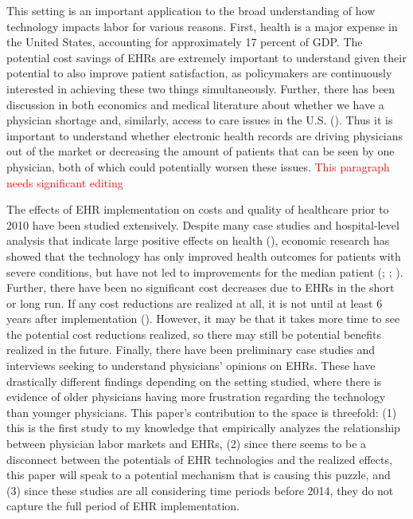 \documentclass[11pt]{article}
\begin{document}
This setting is an important application to the broad understanding of how technology impacts labor for various reasons. First, health is a major expense in the United States, accounting for approximately 17 percent of GDP. The potential cost savings of EHRs are extremely important to understand given their potential to also improve patient satisfaction, as policymakers are continuously interested in achieving these two things simultaneously. Further, there has been discussion in both economics and medical literature about whether we have a physician shortage and, similarly, access to care issues in the U.S. (\cite{cooper2002economic}). Thus it is important to understand whether electronic health records are driving physicians out of the market or decreasing the amount of patients that can be seen by one physician, both of which could potentially worsen these issues. \textcolor{red}{This paragraph needs significant editing}

The effects of EHR implementation on costs and quality of healthcare prior to 2010 have been studied extensively. Despite many case studies and hospital-level analysis that indicate large positive effects on health (\cite{Buntin2011TheResults}), economic research has showed that the technology has only improved health outcomes for patients with severe conditions, but have not led to improvements for the median patient (\cite{Agha2014TheCare}; \cite{McCullough2016HealthCoordination}; \cite{Meyerhoefer}). Further, there have been no significant cost decreases due to EHRs in the short or long run. If any cost reductions are realized at all, it is not until at least 6 years after implementation (\cite{dranove2014trillion}). However, it may be that it takes more time to see the potential cost reductions realized, so there may still be potential benefits realized in the future. Finally, there have been preliminary case studies and interviews seeking to understand physicians' opinions on EHRs. These have drastically different findings depending on the setting studied, where there is evidence of older physicians having more frustration regarding the technology than younger physicians. This paper's contribution to the space is threefold: (1) this is the first study to my knowledge that empirically analyzes the relationship between physician labor markets and EHRs, (2) since there seems to be a disconnect between the potentials of EHR technologies and the realized effects, this paper will speak to a potential mechanism that is causing this puzzle, and (3) since these studies are all considering time periods before 2014, they do not capture the full period of EHR implementation.
\end{document}
